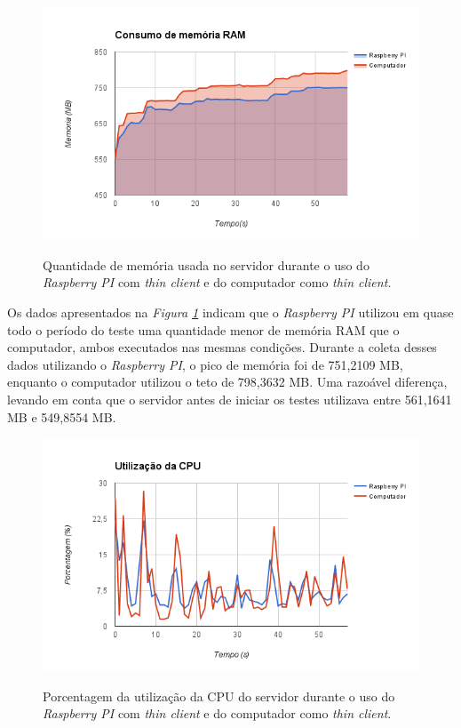 \documentclass[
	12pt,				%
	openright,			%
	twoside,			%
	a4paper,			%
	chapter=TITLE,		%
	english,			%
	brazil				%
	]{abntex2}
\begin{document}
\begin{figure}[!htb]
\centering
\caption{Quantidade de memória usada no servidor durante o uso do \textit{Raspberry PI} com \textit{thin client} e do computador como \textit{thin client.}}
\includegraphics[scale=0.8]{Imagens/memoria}
\label{fig:memoria}
\end{figure}


Os dados apresentados na \textit{Figura \ref{fig:memoria}} indicam que o \textit{Raspberry PI} utilizou em quase todo o período do teste uma quantidade menor de memória RAM que o computador, ambos executados nas mesmas condições. Durante a coleta desses dados utilizando o \textit{Raspberry PI}, o pico de memória foi de 751,2109 MB, enquanto o computador utilizou o teto de 798,3632 MB. Uma razoável diferença, levando em conta que o servidor antes de iniciar os testes utilizava entre 561,1641 MB e 549,8554 MB. 

\begin{figure}[!htb]
\centering
\caption{Porcentagem da utilização da CPU do servidor durante o uso do \textit{Raspberry PI} com \textit{thin client} e do computador como \textit{thin client}.}
\includegraphics[scale=0.8]{Imagens/cpu}
\label{fig:cpu}
\end{figure}
\end{document}
